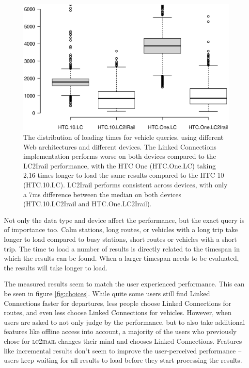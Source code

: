 \documentclass[twocolumn]{phdsymp} %
\begin{document}
\begin{figure}[ht]
	\begin{center}
		\includegraphics[trim=3cm 4cm 0 0, width=.50\textwidth]{images/boxplot_vehicles.eps}
		\caption{\label{fig:vehicle} The distribution of loading times for vehicle queries, using different Web architectures and different devices. The Linked Connections implementation performs worse on both devices compared to the LC2Irail performance, with the HTC One (HTC.One.LC) taking 2,16 times longer to load the same results compared to the HTC 10 (HTC.10.LC). LC2Irail performs consistent across devices, with only a 7ms difference between the median on both devices (HTC.10.LC2Irail and HTC.One.LC2Irail). }
	\end{center}
\end{figure}

Not only the data type and device affect the performance, but the exact query is of importance too. Calm stations, long routes, or vehicles with a long trip take longer to load compared to busy stations, short routes or vehicles with a short trip. The time to load a number of results is directly related to the timespan in which the results can be
found. When a larger timespan needs to be evaluated, the results will take longer to load.

The measured results seem to match the user experienced performance. This can be seen in figure \ref{fig:choices}. While quite some users still find Linked Connections faster for departures, less people choose Linked Connections for routes, and even less choose Linked Connections for vehicles. However, when users are asked to not only judge by the performance, but to also take additional features like offline access into account, a majority of the users who previously chose for \textsc{lc2irail} changes their mind and chooses Linked Connections. Features like incremental results don’t seem to improve the user-perceived performance – users keep waiting for all results to load before they start processing the results.
\end{document}
